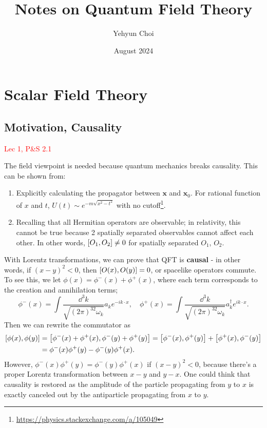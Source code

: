 \documentclass{article}
\title{Notes on Quantum Field Theory}
\author{Yehyun Choi}
\date{August 2024}
\begin{document}
\maketitle
\pagebreak


\section{Scalar Field Theory}
\subsection{Motivation, Causality}
\textcolor{red}{Lec 1, P\&S 2.1}

The field viewpoint is needed because quantum mechanics breaks causality. This can be shown from:
\begin{enumerate}
    \item Explicitly calculating the propagator between $\mathbf x$ and $\mathbf x_0$. For rational function of $x$ and $t$, $U(t)\sim e^{-m\sqrt{x^2-t^2}}$ with no cutoff\footnote{\url{https://physics.stackexchange.com/a/105049}}.
    \item Recalling that all Hermitian operators are observable; in relativity, this cannot be true because 2 spatially separated observables cannot affect each other. In other words, $\comm{O_1}{O_2}\ne 0$ for spatially separated $O_1$, $O_2$.
\end{enumerate}

With Lorentz transformations, we can prove that QFT is \textbf{causal} - in other words, if $(x-y)^2<0$, then $\comm{O(x)}{O(y)}=0$, or spacelike operators commute. To see this, we let $\phi(x)=\phi^-(x)+\phi^+(x)$, where each term corresponds to the creation and annihilation terms;
$$\phi^-(x)=\int\frac{\dd^3k}{\sqrt{(2\pi)^32\omega_k}}a_ke^{-ik\cdot x},\quad \phi^+(x)=\int\frac{\dd^3k}{\sqrt{(2\pi)^32\omega_k}}a^\dag_ke^{ik\cdot x}.$$
Then we can rewrite the commutator as 
\begin{align*}
    \comm{\phi(x)}{\phi(y)}&=\comm{\phi^-(x)+\phi^+(x)}{\phi^-(y)+\phi^+(y)}=\comm{\phi^-(x)}{\phi^+(y)}+\comm{\phi^+(x)}{\phi^-(y)}\\
    &=\phi^-(x)\phi^+(y)-\phi^-(y)\phi^+(x).
\end{align*}
However, $\phi^-(x)\phi^+(y)=\phi^-(y)\phi^+(x)$ if $(x-y)^2<0$, because there's a proper Lorentz transformation between $x-y$ and $y-x$. One could think that causality is restored as the amplitude of the particle propagating from $y$ to $x$ is exactly canceled out by the antiparticle propagating from $x$ to $y$. 
\end{document}
